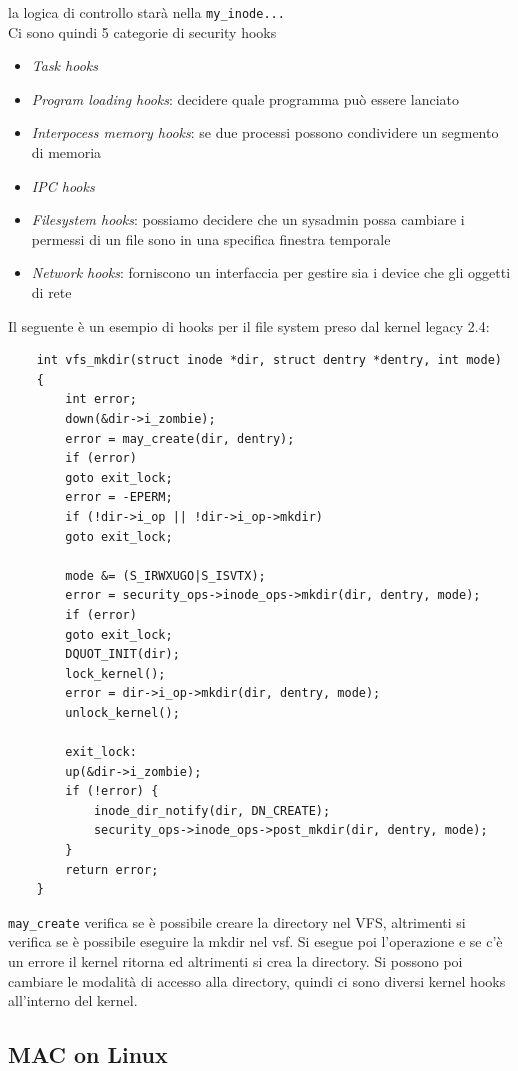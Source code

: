 \documentclass[12pt, oneside]{extbook} %
\begin{document}
la logica di controllo starà nella \texttt{my\_inode...}\\Ci sono quindi 5 categorie di security hooks
\begin{itemize}
\item \textit{Task hooks}
\item \textit{Program loading hooks}: decidere quale programma può essere lanciato
\item \textit{Interpocess memory hooks}: se due processi possono condividere un segmento di memoria
\item \textit{IPC hooks}
\item \textit{Filesystem hooks}: possiamo decidere che un sysadmin possa cambiare i permessi di un file sono in una specifica finestra temporale
\item \textit{Network hooks}: forniscono un interfaccia per gestire sia i device che gli oggetti di rete
\end{itemize}
Il seguente è un esempio di hooks per il file system preso dal kernel legacy 2.4:
\begin{lstlisting}
	int vfs_mkdir(struct inode *dir, struct dentry *dentry, int mode)
	{
		int error;
		down(&dir->i_zombie);
		error = may_create(dir, dentry);
		if (error)
		goto exit_lock;
		error = -EPERM;
		if (!dir->i_op || !dir->i_op->mkdir)
		goto exit_lock;
		
		mode &= (S_IRWXUGO|S_ISVTX);
		error = security_ops->inode_ops->mkdir(dir, dentry, mode);
		if (error)
		goto exit_lock;
		DQUOT_INIT(dir);
		lock_kernel();
		error = dir->i_op->mkdir(dir, dentry, mode);
		unlock_kernel();
		
		exit_lock:
		up(&dir->i_zombie);
		if (!error) {
			inode_dir_notify(dir, DN_CREATE);
			security_ops->inode_ops->post_mkdir(dir, dentry, mode);
		}
		return error;
	}
\end{lstlisting}
\texttt{may\_create} verifica se è possibile creare la directory nel VFS, altrimenti si verifica se è possibile eseguire la mkdir nel vsf. Si esegue poi l'operazione e se c'è un errore il kernel ritorna ed altrimenti si crea la directory. Si possono poi cambiare le modalità di accesso alla directory, quindi ci sono diversi kernel hooks all'interno del kernel.
\subsection{MAC on Linux}
\end{document}
